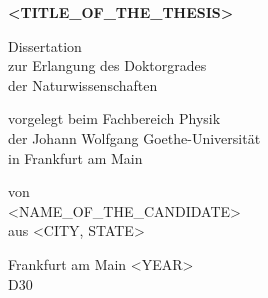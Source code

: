 \begin{titlepage}
  \vspace*{\fill}

  \begin{center} \sffamily\Huge\bfseries
    <TITLE_OF_THE_THESIS>
  \end{center}

  \vspace*{1cm}

  \begin{center} \sffamily\large
    Dissertation\\
    zur Erlangung des Doktorgrades\\
    der Naturwissenschaften
  \end{center}

  \vspace*{1cm}

  \begin{center} \sffamily\large
    vorgelegt beim Fachbereich Physik\\
    der Johann Wolfgang Goethe-Universit\"at\\
    in Frankfurt am Main
  \end{center}

  \vspace*{1cm}

  \begin{center} \sffamily\large
    von\\
    <NAME_OF_THE_CANDIDATE>\\
    aus <CITY, STATE>
  \end{center}

  \vspace*{1cm}

  \begin{center} \sffamily\large
    Frankfurt am Main <YEAR>\\
    D30
  \end{center}

  \vspace*{\fill}
\end{titlepage}
